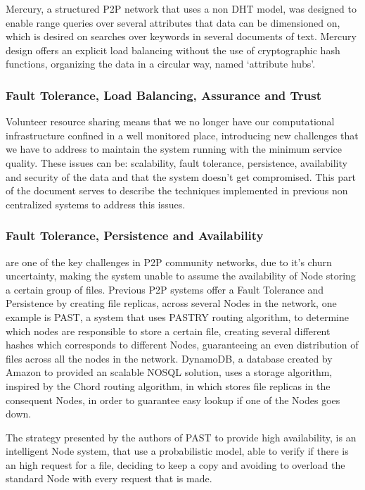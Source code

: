 Mercury\cite{Bharambe}, a structured P2P network that uses a non DHT model, was designed to enable range queries over several attributes that data can be dimensioned on, which is desired on searches over keywords in several documents of text. Mercury design offers an explicit load balancing without the use of cryptographic hash functions, organizing the data in a circular way, named `attribute hubs'.

\subsubsection{Fault Tolerance, Load Balancing, Assurance and Trust}

Volunteer resource sharing means that we no longer have our computational infrastructure confined in a well monitored place, introducing new challenges that we have to address \cite{Koloniari2005} to maintain the system running with the minimum service quality. These issues can be: scalability, fault tolerance, persistence, availability and security\cite{Wallach} of the data and that the system doesn't get compromised. This part of the document serves to describe the techniques implemented in previous non centralized systems to address this issues.

\subsubsection{Fault Tolerance, Persistence and Availability}\label{par:Fault Tolerance, Persistence and Availability}

are one of the key challenges in P2P community networks, due to it's churn uncertainty, making the system unable to assume the availability of Node storing a certain group of files. Previous P2P systems offer a Fault Tolerance and Persistence by creating file replicas, across several Nodes in the network, one example is PAST\cite{Rowstron2001}\cite{Rowstron2001a}, a system that uses PASTRY routing algorithm, to determine which nodes are responsible to store a certain file, creating several different hashes which corresponds to different Nodes, guaranteeing an even distribution of files across all the nodes in the network. DynamoDB\cite{Decandia2007}, a database created by Amazon to provided an scalable NOSQL solution, uses a storage algorithm, inspired by the Chord routing algorithm, in which stores file replicas in the consequent Nodes, in order to guarantee easy lookup if one of the Nodes goes down.

The strategy presented by the authors of PAST to provide high availability, is an intelligent Node system, that use a probabilistic model, able to verify if there is an high request for a file, deciding to keep a copy and avoiding to overload the standard Node with every request that is made.

